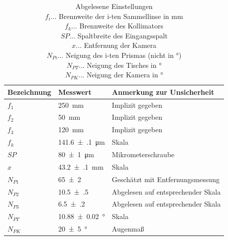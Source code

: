 \documentclass[12pt,english,ngerman]{scrartcl}
\begin{document}
\begin{table}[H]
	\caption[Abgelesene Einstellungen]{Abgelesene Einstellungen\\
	$f_i \dots$ Brennweite der i-ten Sammellinse in mm\\
	$f_k \dots$ Brennweite des Kollimators\\
	$SP \dots$ Spaltbreite des Eingangsspalt\\
	$x \dots$ Entfernung der Kamera\\
	$N_{Pi} \dots$ Neigung des i-ten Prismas (nicht in °)\\
	$N_{PT} \dots$ Neigung des Tisches in °\\
	$N_{PK} \dots$ Neigung der Kamera in ° }
	\begin{tabular}{|l|l|l|}
	\hline
	\textbf{Bezeichnung} & \textbf{Messwert}        & \textbf{Anmerkung zur Unsicherheit} \\ \hline
	$f_1$                & \SI{250}{\mm}            & Implizit gegeben                    \\ \hline
	$f_2$                & \SI{50}{\mm}             & Implizit gegeben                    \\ \hline
	$f_3$                & \SI{120}{\mm}            & Implizit gegeben                    \\ \hline
	$f_k$                & \SI{141.6(1)}{\micro\m}  & Skala                               \\ \hline
	$SP$                 & \SI{80(1)}{\micro\m}     & Mikrometerschraube                  \\ \hline
	$x$                  & \SI{43.2(1)}{\mm}        & Skala                               \\ \hline
	$N_{P1}$             & \SI{65(2)}{}             & Geschätzt mit Entfernungsmessung    \\ \hline
	$N_{P2}$             & \SI{10.5(5)}{}           & Abgelesen auf entsprechender Skala  \\ \hline
	$N_{P3}$             & \SI{6.5(2)}{}            & Abgelesen auf entsprechender Skala  \\ \hline
	$N_{PT}$             & \SI{10.88(2)}{\degree}   & Skala                               \\ \hline
	$N_{PK}$             & \SI{20(5)}{\degree}      & Augenmaß                            \\ \hline
	\end{tabular}
	\label{tab:einstellungen}
	\end{table}
\end{document}
